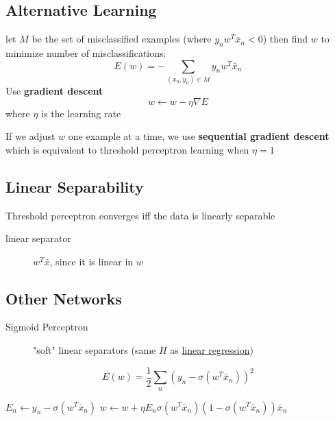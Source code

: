 \documentclass[]{article}
\theoremstyle{definition}
\begin{document}
    \subsection{Alternative Learning}
    \label{sub:alternative_learning}
    let $M$ be the set of misclassified examples (where $y_n w^T \bar x_n < 0$) then find $w$ to minimize number of misclassifications:
    \begin{equation*}
        E(w) = - \sum_{(x_n, y_n) \in M} y_n w^T \bar x_n
    \end{equation*}
    Use \textbf{gradient descent} 
    \begin{equation*}
        w \leftarrow w - \eta \nabla E 
    \end{equation*}
    where $\eta$ is the learning rate

    \vspace{5mm}

    If we adjust $w$ one example at a time, we use \textbf{sequential gradient descent} which is equivalent to threshold perceptron learning when $\eta = 1$

    \subsection{Linear Separability}
    \label{sub:linear_separability}
    Threshold perceptron converges iff the data is linearly separable

    \begin{description}
        \item[linear separator] $w^T \bar x$, since it is linear in $w$
    \end{description} 

    \subsection{Other Networks}
    \label{sub:other_networks}
    \begin{description}
        \item[Sigmoid Perceptron] "soft" linear separators (same $H$ as \hyperref[sec:logistic_regression]{linear regression})
    \end{description}
    \begin{equation*}
        E(w) = \frac{1}{2} \sum_n (y_n - \sigma (w^T \bar x_n))^2
    \end{equation*}
    \begin{algorithmic}
        \State $E_n \leftarrow y_n - \sigma (w^T \bar x_n)$
        \State $w \leftarrow w + \eta E_n \sigma (w^T \bar x_n)(1 - \sigma (w^T \bar x_n)) \bar x_n$
        \EndFor
    \end{algorithmic} 
\end{document}
